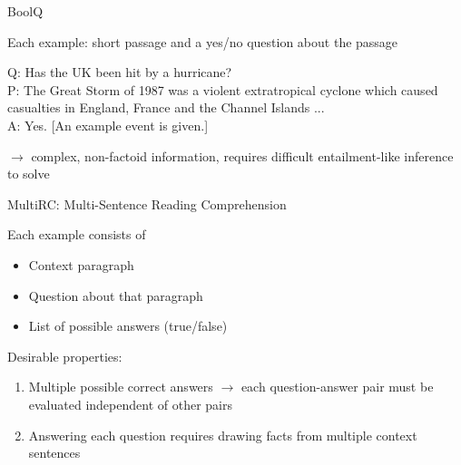 \documentclass[12pt,aspectratio=169,handout]{beamer}
\begin{document}
\begin{frame}{BoolQ}
	
Each example: short passage and a yes/no question about the passage

\begin{example}
Q: Has the UK been hit by a hurricane? \\
P: The Great Storm of 1987 was a violent extratropical cyclone which caused casualties in England, France and the Channel Islands ... \\
A: Yes. [An example event is given.]
\end{example}
	
$\to$ complex, non-factoid information, requires difficult entailment-like inference to solve


\end{frame}



\begin{frame}{MultiRC: Multi-Sentence Reading Comprehension}

Each example consists of
\begin{itemize}
	\item Context paragraph
	\item Question about that paragraph
	\item List of possible answers (true/false)
\end{itemize}

Desirable properties:
\begin{enumerate}
	\item Multiple possible correct answers $\to$ each question-answer pair must be evaluated independent of other pairs
	\item Answering each question requires drawing facts from multiple context sentences
\end{enumerate}



\end{frame}
\end{document}
